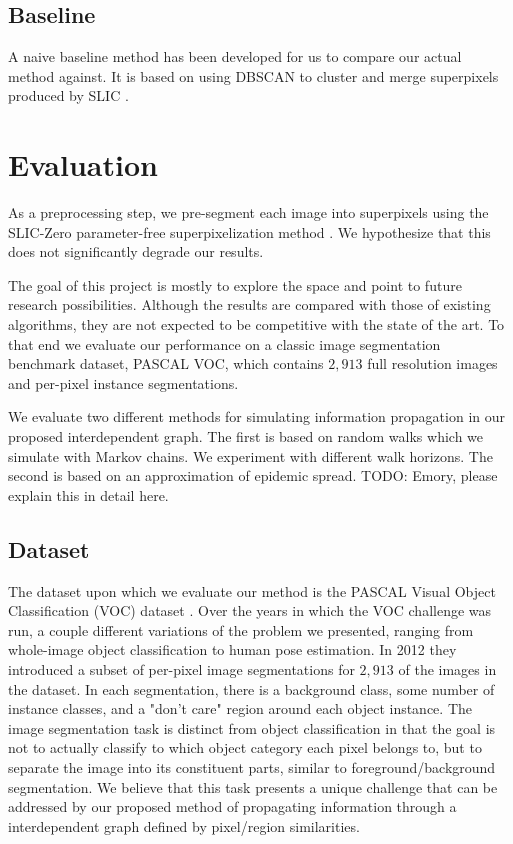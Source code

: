 \documentclass[twocolumn]{article}
\newcommand{\todo}[1]{}
\renewcommand{\todo}[1]{{\color{red} TODO: {#1}}}
\newcommand{\seclab}[1]{\label{sec:#1}}
\begin{document}
\subsection{Baseline}

A naive baseline method has been developed for us to compare our actual method
against. It is based on using DBSCAN \cite{ester1996density} to cluster and
merge superpixels produced by SLIC \cite{achanta2010slic}.

\section{Evaluation}\seclab{eval}


As a preprocessing step, we pre-segment each image into superpixels using the
SLIC-Zero parameter-free superpixelization method \cite{achanta2010slic}. We
hypothesize that this does not significantly degrade our results. 

The goal of this project is mostly to explore the space and point to future
research possibilities. Although the results are compared with those of
existing algorithms, they are not expected to be competitive with the state of
the art. To that end we evaluate our performance on a classic image segmentation
benchmark dataset, PASCAL VOC, which contains $2,913$ full resolution images and
per-pixel instance segmentations.

We evaluate two different methods for simulating information propagation in our
proposed interdependent graph. The first is based on random walks which we
simulate with Markov chains. We experiment with different walk horizons. The
second is based on an approximation of epidemic spread. \todo{Emory, please
explain this in detail here.}

\subsection{Dataset}\seclab{data}

The dataset upon which we evaluate our method is the PASCAL Visual Object
Classification (VOC) dataset \cite{Everingham10}. Over the years in which the
VOC challenge was run, a couple different variations of the problem we
presented, ranging from whole-image object classification to human pose
estimation. In 2012 they introduced a subset of per-pixel image segmentations
for $2,913$ of the images in the dataset. In each segmentation, there is a
background class, some number of instance classes, and a "don't care" region
around each object instance. The image segmentation task is distinct from
object classification in that the goal is not to actually classify to which
object category each pixel belongs to, but to separate the image into its
constituent parts, similar to foreground/background segmentation. We believe
that this task presents a unique challenge that can be addressed by our proposed
method of propagating information through a interdependent graph defined by
pixel/region similarities.
\end{document}
